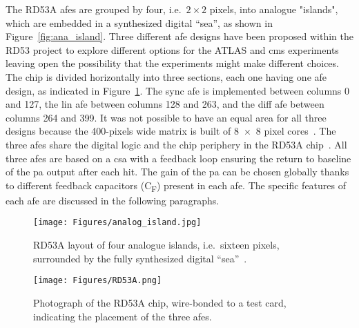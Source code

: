 The RD53A \gls{afe}s are grouped by four, i.e.~$2\times2$ pixels, into analogue "islands", which are embedded in a synthesized digital “sea”, as shown in Figure~\ref{fig:ana_island}.
Three different \gls{afe} designs have been proposed within the RD53 project to explore different options for the ATLAS and \gls{cms} experiments leaving open the possibility that the experiments might make different choices.
The chip is divided horizontally into three sections, each one having one \gls{afe} design, as indicated in Figure~\ref{fig:rd53achip}. The \gls{sync} \gls{afe} is implemented between columns \num{0} and \num{127}, the \gls{lin} \gls{afe} between columns \num{128} and \num{263}, and the \gls{diff} \gls{afe} between columns \num{264} and \num{399}. It was not possible to have an equal area for all three designs because the 400-pixels wide matrix is built of \num{8x8} pixel cores~\citep{rd53a_manual}.
The three \glspl{afe} share the digital logic and the chip periphery in the RD53A chip~\citep{rd53a_manual}.
All three \gls{afe}s are based on a \gls{csa} with a feedback loop ensuring the return to baseline of the \gls{pa} output after each hit. The gain of the \gls{pa} can be chosen globally thanks to different feedback capacitors (C\textsubscript{F}) present in each \gls{afe}. The specific features of each \gls{afe} are discussed in the following paragraphs. 

\begin{figure}[ht]
    \captionsetup{justification=centering}
    \begin{minipage}{0.45\textwidth}
        \centering
        \texttt{[image: Figures/analog\_island.jpg]}
        \caption{RD53A layout of four analogue islands, i.e.~sixteen pixels, surrounded by the fully synthesized digital “sea”~\citep{rd53a_manual}.}
        \label{fig:ana_island}
    \end{minipage}
    \hfill
    \begin{minipage}{0.5\textwidth}
        \centering
        \texttt{[image: Figures/RD53A.png]}
        \caption{Photograph of the RD53A chip, wire-bonded to a test card, indicating the placement of the three \acrlong{afe}s.}
        \label{fig:rd53achip}
    \end{minipage}
\end{figure}

